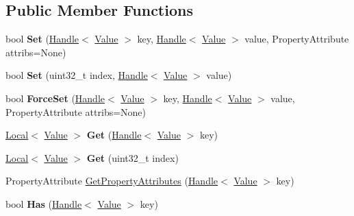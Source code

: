 \subsection*{Public Member Functions}
\begin{DoxyCompactItemize}
\item 
\hypertarget{classv8_1_1Object_a208583edae8e8da2c083879429ee3184}{bool {\bfseries Set} (\hyperlink{classv8_1_1Handle}{Handle}$<$ \hyperlink{classv8_1_1Value}{Value} $>$ key, \hyperlink{classv8_1_1Handle}{Handle}$<$ \hyperlink{classv8_1_1Value}{Value} $>$ value, Property\-Attribute attribs=None)}\label{classv8_1_1Object_a208583edae8e8da2c083879429ee3184}

\item 
\hypertarget{classv8_1_1Object_a5779059211f275447f433e7f8a859dd0}{bool {\bfseries Set} (uint32\-\_\-t index, \hyperlink{classv8_1_1Handle}{Handle}$<$ \hyperlink{classv8_1_1Value}{Value} $>$ value)}\label{classv8_1_1Object_a5779059211f275447f433e7f8a859dd0}

\item 
\hypertarget{classv8_1_1Object_aa89f3dce24a3a3431295218d24498c52}{bool {\bfseries Force\-Set} (\hyperlink{classv8_1_1Handle}{Handle}$<$ \hyperlink{classv8_1_1Value}{Value} $>$ key, \hyperlink{classv8_1_1Handle}{Handle}$<$ \hyperlink{classv8_1_1Value}{Value} $>$ value, Property\-Attribute attribs=None)}\label{classv8_1_1Object_aa89f3dce24a3a3431295218d24498c52}

\item 
\hypertarget{classv8_1_1Object_a976f0329ff7465c124652d633d469c06}{\hyperlink{classv8_1_1Local}{Local}$<$ \hyperlink{classv8_1_1Value}{Value} $>$ {\bfseries Get} (\hyperlink{classv8_1_1Handle}{Handle}$<$ \hyperlink{classv8_1_1Value}{Value} $>$ key)}\label{classv8_1_1Object_a976f0329ff7465c124652d633d469c06}

\item 
\hypertarget{classv8_1_1Object_aa494683803b31bcedab121929f4b0b17}{\hyperlink{classv8_1_1Local}{Local}$<$ \hyperlink{classv8_1_1Value}{Value} $>$ {\bfseries Get} (uint32\-\_\-t index)}\label{classv8_1_1Object_aa494683803b31bcedab121929f4b0b17}

\item 
Property\-Attribute \hyperlink{classv8_1_1Object_a45506d0a9192b023284b0211e9bf545b}{Get\-Property\-Attributes} (\hyperlink{classv8_1_1Handle}{Handle}$<$ \hyperlink{classv8_1_1Value}{Value} $>$ key)
\item 
\hypertarget{classv8_1_1Object_a3548568db2a5baa80ffe17c02b3b4880}{bool {\bfseries Has} (\hyperlink{classv8_1_1Handle}{Handle}$<$ \hyperlink{classv8_1_1Value}{Value} $>$ key)}\label{classv8_1_1Object_a3548568db2a5baa80ffe17c02b3b4880}


\end{DoxyCompactItemize}
